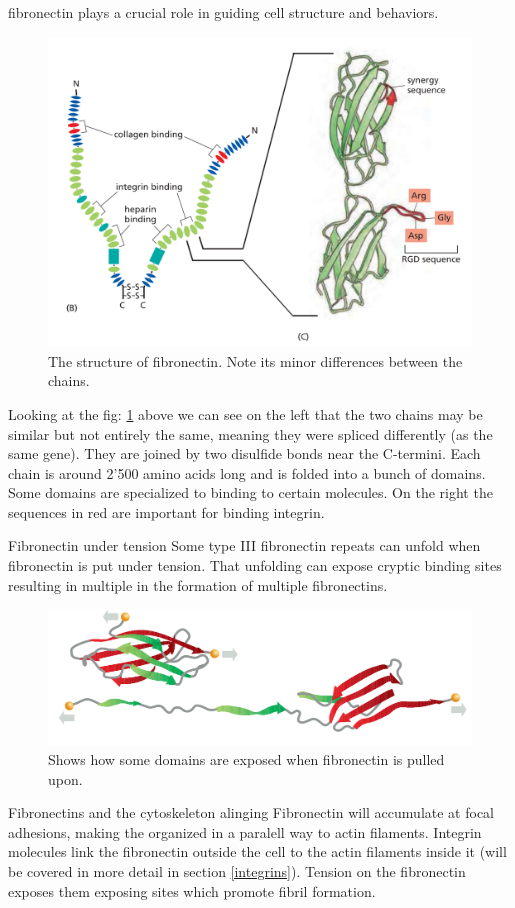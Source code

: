 \documentclass[../main.tex]{subfiles}
\begin{document}
\gls{fibronectin} plays a crucial role in guiding cell structure and behaviors.

\begin{figure}[H]
	\centering
	\includegraphics[width=0.6\linewidth]{fibr_struc}
	\caption{The structure of fibronectin. Note its minor differences between the chains.}
	\label{fig:fibrstruc}
\end{figure}

Looking at the fig: \ref{fig:fibrstruc} above we can see on the left that the two chains may be similar but not entirely the same, meaning they were spliced differently (as the same gene). They are joined by two disulfide bonds near the C-termini. Each chain is around 2'500 amino acids long and is folded into a bunch of domains. Some domains are specialized to binding to certain molecules. On the right the sequences in red are important for binding \gls{integrin}. \\

\begin{RemarkWithTitel}{Fibronectin under tension}
	Some type III fibronectin repeats can unfold when fibronectin is put under tension. That unfolding can expose cryptic binding sites resulting in multiple in the formation of multiple fibronectins.
\end{RemarkWithTitel}

\begin{figure}
	\centering
	\includegraphics[width=0.4\linewidth]{fibr_tens}
	\caption{Shows how some domains are exposed when fibronectin is pulled upon.}
	\label{fig:fibrtens}
\end{figure}



\begin{RemarkWithTitel}{Fibronectins and the cytoskeleton alinging}
	Fibronectin will accumulate at focal adhesions, making the organized in a paralell way to actin filaments. Integrin molecules link the fibronectin outside the cell to the actin filaments inside it (will be covered in more detail in section \ref{integrins}). Tension on the fibronectin exposes them exposing sites which promote fibril formation.
\end{RemarkWithTitel}
\end{document}
